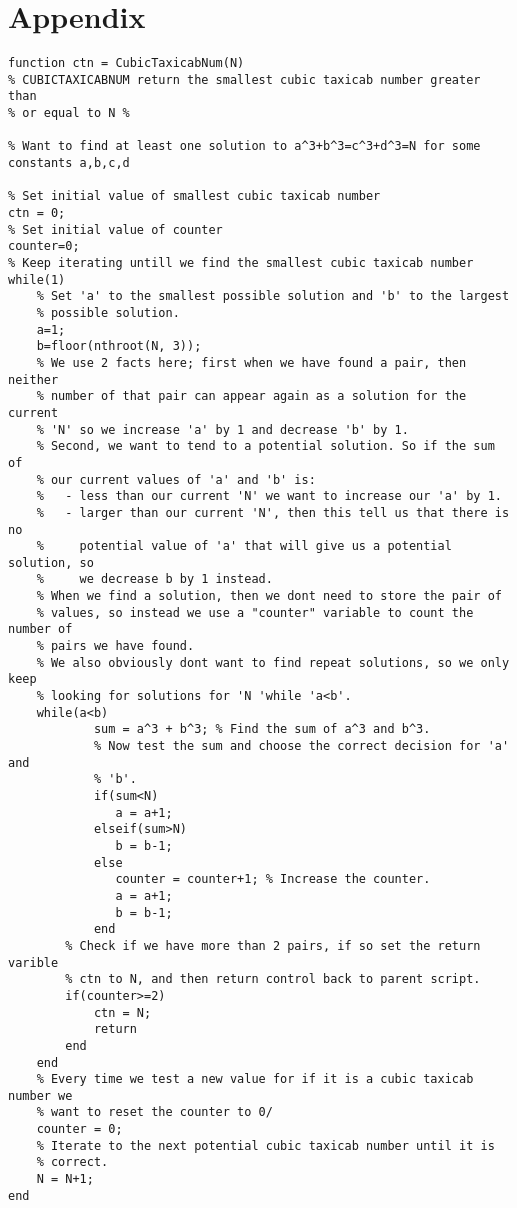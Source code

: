 \documentclass[12pt]{article}
\begin{document}
\section*{Appendix}
\UseRawInputEncoding
\begin{lstlisting}[caption={Complete Matlab code for Cubic Taxicab Number},label={M1_Complete}]
function ctn = CubicTaxicabNum(N)
% CUBICTAXICABNUM return the smallest cubic taxicab number greater than
% or equal to N %

% Want to find at least one solution to a^3+b^3=c^3+d^3=N for some constants a,b,c,d

% Set initial value of smallest cubic taxicab number
ctn = 0;
% Set initial value of counter
counter=0;
% Keep iterating untill we find the smallest cubic taxicab number
while(1)
    % Set 'a' to the smallest possible solution and 'b' to the largest
    % possible solution.
    a=1;
    b=floor(nthroot(N, 3));
    % We use 2 facts here; first when we have found a pair, then neither
    % number of that pair can appear again as a solution for the current
    % 'N' so we increase 'a' by 1 and decrease 'b' by 1.
    % Second, we want to tend to a potential solution. So if the sum of
    % our current values of 'a' and 'b' is:
    %   - less than our current 'N' we want to increase our 'a' by 1.
    %   - larger than our current 'N', then this tell us that there is no
    %     potential value of 'a' that will give us a potential solution, so
    %     we decrease b by 1 instead.
    % When we find a solution, then we dont need to store the pair of
    % values, so instead we use a "counter" variable to count the number of
    % pairs we have found.
    % We also obviously dont want to find repeat solutions, so we only keep
    % looking for solutions for 'N 'while 'a<b'.
    while(a<b)
            sum = a^3 + b^3; % Find the sum of a^3 and b^3.
            % Now test the sum and choose the correct decision for 'a' and
            % 'b'.
            if(sum<N)
               a = a+1;
            elseif(sum>N)
               b = b-1;
            else
               counter = counter+1; % Increase the counter.
               a = a+1;
               b = b-1;
            end
        % Check if we have more than 2 pairs, if so set the return varible
        % ctn to N, and then return control back to parent script.
        if(counter>=2)
            ctn = N;
            return
        end
    end
    % Every time we test a new value for if it is a cubic taxicab number we
    % want to reset the counter to 0/
    counter = 0;
    % Iterate to the next potential cubic taxicab number until it is
    % correct.
    N = N+1;
end
\end{lstlisting}
\end{document}
